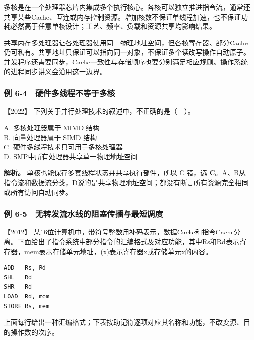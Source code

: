 多核是在一个处理器芯片内集成多个执行核心。各核可以独立推进指令流，通常还共享某些Cache、互连或内存控制资源。增加核数不保证单线程加速，也不保证功耗必然高于任意单核设计；工艺、频率、负载和资源共享均影响结果。

共享内存多处理器让各处理器使用同一物理地址空间，但各核寄存器、部分Cache仍可私有。共享地址只保证可以指向同一对象，不保证多个读改写操作自动原子。并发程序还需要同步，Cache一致性与存储顺序也要分别满足相应规则。操作系统的进程同步讲义会沿用这一边界。

\subsubsection{例 6-4　硬件多线程不等于多核}\label{co-ex6-4}

\noindent{}【2022】 下列关于并行处理技术的叙述中，不正确的是（　）。

A. 多核处理器属于 MIMD 结构\\
B. 向量处理器属于 SIMD 结构\\
C. 硬件多线程技术只可用于多核处理器\\
D. SMP中所有处理器共享单一物理地址空间


\textbf{解析。} 单核也能保存多套线程状态并共享执行部件，所以 C 错，选 \textbf{C}。A、B从指令流和数据流分类，D说的是共享物理地址空间；都没有断言所有资源完全相同或所有访问自动同步。

\subsubsection{例 6-5　无转发流水线的阻塞传播与最短调度}\label{co-ex6-5}

\noindent{}【2012】 某16位计算机中，带符号整数用补码表示，数据Cache和指令Cache分离。下面给出了指令系统中部分指令的汇编格式及对应功能，其中Rs和Rd表示寄存器，mem表示存储单元地址，(x)表示寄存器x或存储单元x的内容。

\par\medskip\noindent
\begin{minipage}{\linewidth}
\begin{verbatim}
ADD   Rs, Rd
SHL   Rd
SHR   Rd
LOAD  Rd, mem
STORE Rs, mem
\end{verbatim}
\end{minipage}\par\medskip

上面每行给出一种汇编格式；下表按助记符逐项对应其名称和功能，不改变源、目的操作数的次序。

